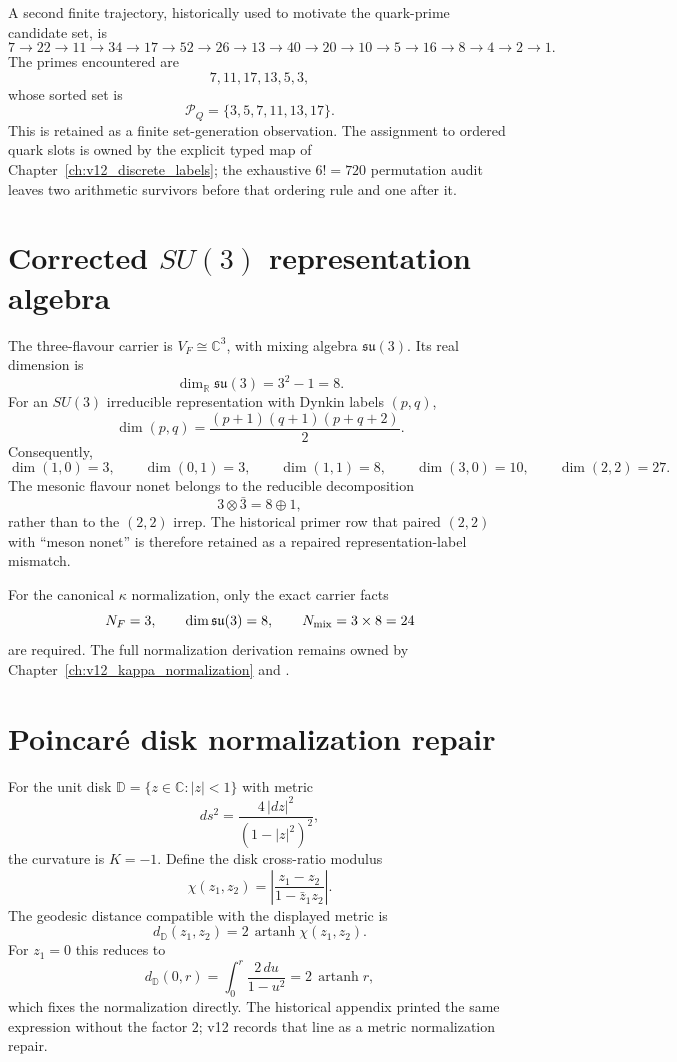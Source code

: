 A second finite trajectory, historically used to motivate the quark-prime
candidate set, is
\[
7\to22\to11\to34\to17\to52\to26\to13\to40\to20\to10\to5
\to16\to8\to4\to2\to1.
\]
The primes encountered are
\[
7,11,17,13,5,3,
\]
whose sorted set is
\[
\mathcal P_Q=\{3,5,7,11,13,17\}.
\]
This is retained as a finite set-generation observation.  The assignment to
ordered quark slots is owned by the explicit typed map of
Chapter~\ref{ch:v12_discrete_labels}; the exhaustive \(6!=720\) permutation
audit leaves two arithmetic survivors before that ordering rule and one after
it.

\section{Corrected \(SU(3)\) representation algebra}

The three-flavour carrier is \(V_F\cong\mathbb C^3\), with mixing algebra
\(\mathfrak{su}(3)\).  Its real dimension is
\[
\dim_{\mathbb R}\mathfrak{su}(3)=3^2-1=8.
\]
For an \(SU(3)\) irreducible representation with Dynkin labels \((p,q)\),
\[
\boxed{
\dim(p,q)=\frac{(p+1)(q+1)(p+q+2)}{2}.
}
\]
Consequently,
\[
\dim(1,0)=3,\qquad
\dim(0,1)=3,\qquad
\dim(1,1)=8,\qquad
\dim(3,0)=10,\qquad
\dim(2,2)=27.
\]
The mesonic flavour nonet belongs to the reducible decomposition
\[
\boxed{
3\otimes\bar3=8\oplus1,
}
\]
rather than to the \((2,2)\) irrep.  The historical primer row that paired
\((2,2)\) with ``meson nonet'' is therefore retained as a repaired
representation-label mismatch.

For the canonical \(\kappa\) normalization, only the exact carrier facts
\[
N_F=3,\qquad \dim\mathfrak{su}(3)=8,\qquad N_{\rm mix}=3\times8=24
\]
are required.  The full normalization derivation remains owned by
Chapter~\ref{ch:v12_kappa_normalization} and
.

\section{Poincar\'e disk normalization repair}

For the unit disk \(\mathbb D=\{z\in\mathbb C:|z|<1\}\) with metric
\[
ds^2=\frac{4\,|dz|^2}{(1-|z|^2)^2},
\]
the curvature is \(K=-1\).  Define the disk cross-ratio modulus
\[
\chi(z_1,z_2)=
\left|
\frac{z_1-z_2}{1-\bar z_1z_2}
\right|.
\]
The geodesic distance compatible with the displayed metric is
\[
\boxed{
d_{\mathbb D}(z_1,z_2)
=2\,\operatorname{artanh}\chi(z_1,z_2).
}
\]
For \(z_1=0\) this reduces to
\[
d_{\mathbb D}(0,r)=\int_0^r\frac{2\,du}{1-u^2}
=2\,\operatorname{artanh}r,
\]
which fixes the normalization directly.  The historical appendix printed the
same expression without the factor \(2\); v12 records that line as a metric
normalization repair.

